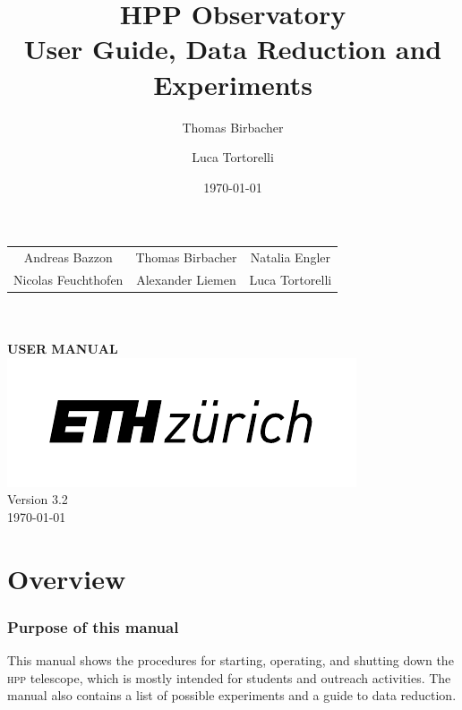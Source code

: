 \documentclass[a4paper, 11pt, fleqn]{memoir}
\begin{document}
\date{\today}
\author{Thomas Birbacher \and Luca Tortorelli}
\title{HPP Observatory \\ User Guide, Data Reduction and Experiments}


\begin{titlingpage}
    \begin{center}
        \vspace{4cm}
        {\large\bfseries
        \begin{tabular}{ccc}
            Andreas Bazzon & Thomas Birbacher & Natalia Engler\\
            Nicolas Feuchthofen & Alexander Liemen & Luca Tortorelli
        \end{tabular}
        }\\
        \vspace{3cm}
        {}\\
        \vspace{0.6cm}
        {\LARGE\bfseries {} USER MANUAL}\\
        \vfill
        \includegraphics{eth-logo}\\
        Version 3.2\\
        \today
    \end{center}
\end{titlingpage}

\newcommand{\software}[1]{\texttt{#1}}

\frontmatter

\chapter{Overview}

\subsection*{Purpose of this manual}

This manual shows the procedures for starting, operating, and shutting down the \textsc{hpp} telescope, which is mostly intended for students and outreach activities.
The manual also contains a list of possible experiments and a guide to data reduction.
\end{document}
